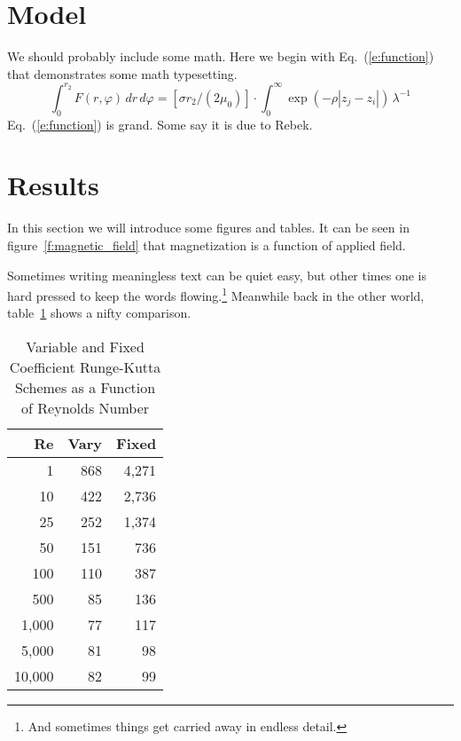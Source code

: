\documentclass[]{aiaa-tc}%
\begin{document}
\section{Model}

We should probably include some math.
Here we begin with Eq.~(\ref{e:function}) that demonstrates some math
typesetting.
\begin{equation}
 \label{e:function}
 \int_{0}^{r_{2}} F(r,\varphi) \, dr \, d\varphi =
    \left[ \sigma r_{2}/(2\mu_{0}) \right] \cdot
    \int_{0}^{\infty} \exp(-\rho|z_{j}-z_{i}|) \, \lambda^{-1} 
\end{equation}
Eq.~(\ref{e:function}) is grand.
Some say it is due to Rebek.\cite{rebek:82bk}

\section{Results}

In this section we will introduce some figures and tables.
It can be seen in figure~\ref{f:magnetic_field} that magnetization is a
function of applied field.

Sometimes writing meaningless text can be quiet easy, but other times
one is hard pressed to keep the words flowing.\footnote{And sometimes
things get carried away in endless detail.}
Meanwhile back in the other world, table~\ref{t:scheme_comparison} shows
a nifty comparison.
\begin{table}%
 \begin{center}
  \caption{Variable and Fixed Coefficient Runge-Kutta Schemes as a
           Function of Reynolds Number}
  \label{t:scheme_comparison}
  \begin{tabular}{rrr}
       Re & Vary & Fixed \\\hline
        1 &  868 & 4,271 \\
       10 &  422 & 2,736 \\
       25 &  252 & 1,374 \\
       50 &  151 &   736 \\
      100 &  110 &   387 \\
      500 &   85 &   136 \\
    1,000 &   77 &   117 \\
    5,000 &   81 &    98 \\
   10,000 &   82 &    99
  \end{tabular}
 \end{center}
\end{table}
\end{document}
